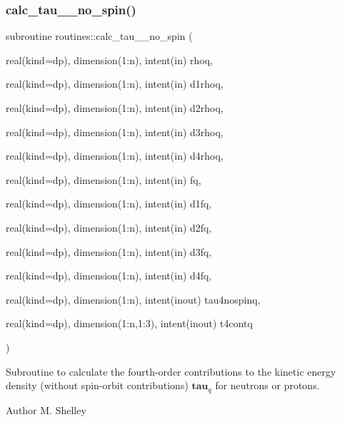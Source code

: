 \subsubsection{\texorpdfstring{calc\+\_\+tau\+\_\+\_\+no\+\_\+spin()}{calc\_tau\_4\_no\_spin()}}
{\footnotesize\ttfamily subroutine routines\+::calc\+\_\+tau\+\_\+\_\+no\+\_\+spin (\begin{DoxyParamCaption}\item[{real(kind=dp), dimension(1\+:n), intent(in)}]{rhoq,  }\item[{real(kind=dp), dimension(1\+:n), intent(in)}]{d1rhoq,  }\item[{real(kind=dp), dimension(1\+:n), intent(in)}]{d2rhoq,  }\item[{real(kind=dp), dimension(1\+:n), intent(in)}]{d3rhoq,  }\item[{real(kind=dp), dimension(1\+:n), intent(in)}]{d4rhoq,  }\item[{real(kind=dp), dimension(1\+:n), intent(in)}]{fq,  }\item[{real(kind=dp), dimension(1\+:n), intent(in)}]{d1fq,  }\item[{real(kind=dp), dimension(1\+:n), intent(in)}]{d2fq,  }\item[{real(kind=dp), dimension(1\+:n), intent(in)}]{d3fq,  }\item[{real(kind=dp), dimension(1\+:n), intent(in)}]{d4fq,  }\item[{real(kind=dp), dimension(1\+:n), intent(inout)}]{tau4nospinq,  }\item[{real(kind=dp), dimension(1\+:n,1\+:3), intent(inout)}]{t4contq }\end{DoxyParamCaption})}



Subroutine to calculate the fourth-\/order contributions to the kinetic energy density (without spin-\/orbit contributions) $\textbf{tau}_q$ for neutrons or protons. 

\begin{DoxyAuthor}{Author}
M. Shelley 
\end{DoxyAuthor}

